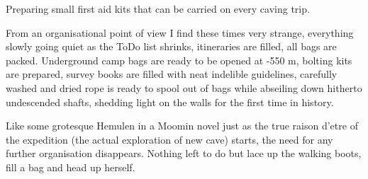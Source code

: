 \begin{marginfigure}
\checkoddpage \ifoddpage \forcerectofloat \else \forceversofloat \fi
\centering
 \caption{Preparing small first aid kits that can be carried on every caving trip. }
 \label{caving first aid}
\end{marginfigure}


From an organisational point of view I find these times very strange,
everything slowly going quiet as the ToDo list shrinks, itineraries
are filled, all bags are packed. Underground camp bags are ready to be
opened at -550 m, bolting kits are prepared, survey books are filled
with neat indelible guidelines, carefully washed and dried rope is
ready to spool out of bags while abseiling down hitherto undescended
shafts, shedding light on the walls for the first time in history.

Like some grotesque Hemulen in a Moomin novel just as the true raison d'etre of the expedition (the actual exploration of new cave) starts, the need for any further organisation disappears. Nothing left to do but lace up the walking boots, fill a bag and head up  herself.

